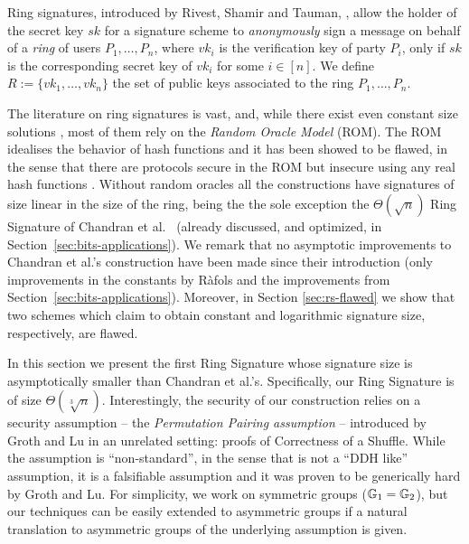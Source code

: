 Ring signatures, introduced by Rivest, Shamir and Tauman, \cite{AC:RivShaTau01}, allow the holder of the secret key $sk$ for a signature scheme to \emph{anonymously} sign a message on behalf of a \emph{ring} of users $P_1,\ldots,P_n$, where $vk_i$ is the verification key of party $P_i$, only if $sk$ is the corresponding secret key of $vk_i$ for some $i\in[n]$. We define $R:=\{vk_1,\ldots,vk_n\}$ the set of public keys associated to the ring $P_1,\ldots,P_n$.

The literature on ring signatures is vast, and, while there exist even constant size solutions \cite{EC:DKNS04}, most of them rely on the \emph{Random Oracle Model} (ROM). The ROM idealises the behavior of hash functions and it has been showed to be flawed, in the sense that there are protocols secure in the ROM but insecure using any real hash functions \cite{STOC:CanGolHal98}. Without random oracles all the constructions have signatures of size linear in the size of the ring, being the the sole exception the $\Theta(\sqrt{n})$ Ring Signature of Chandran et al.~\cite{ICALP:ChaGroSah07} (already discussed, and optimized, in Section~\ref{sec:bits-applications}). We remark that no asymptotic improvements to Chandran et al.'s construction have been made since their introduction (only improvements in the constants by R\`afols \cite{TCC:Rafols15} and the improvements from Section~\ref{sec:bits-applications}). Moreover, in Section \ref{sec:rs-flawed} we show that two schemes which claim to obtain constant and logarithmic signature size, respectively, are flawed.


In this section we present the first Ring Signature whose signature size is asymptotically smaller than Chandran et al.'s. Specifically, our Ring Signature is of size $\Theta(\sqrt[3]{n})$. Interestingly, the security of our construction relies on a security assumption -- the \emph{Permutation Pairing assumption} -- introduced by Groth and Lu \cite{AC:GroLu07} in an unrelated setting: proofs of Correctness of a Shuffle. While the assumption is ``non-standard'', in the sense that is not a ``DDH like'' assumption, it is a falsifiable assumption and it was proven to be generically hard by Groth and Lu. For simplicity, we work on symmetric groups ($\mathbb{G}_1=\mathbb{G}_2$), but our techniques can be easily extended to asymmetric groups if a natural translation to asymmetric groups of the underlying assumption is given.

